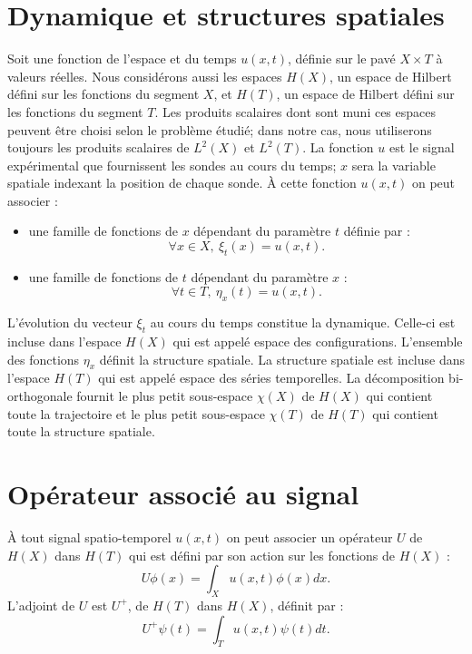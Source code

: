 \documentclass{book}
\begin{document}
\section{Dynamique et structures
spatiales}
Soit une fonction de l'espace et du temps $u(x,t)$,
d\'efinie sur le pav\'e $X \times T$ \`a valeurs r\'eelles. Nous
consid\'erons aussi les espaces
$H(X)$, un espace de Hilbert d\'efini sur les fonctions du segment $X$,
et $H(T)$, un espace de Hilbert d\'efini sur les fonctions du
segment $T$. Les produits scalaires dont sont muni ces espaces peuvent
\^etre 
choisi selon le probl\`eme \'etudi\'e; dans notre cas, nous utiliserons
toujours les produits scalaires de $L^2(X)$ et $L^2(T)$.
La fonction $u$ est  le signal exp\'erimental que fournissent les
sondes au cours du temps;  $x$ sera la variable spatiale indexant la
position de chaque sonde.
\`A cette fonction $u(x,t)$ on peut associer :

\begin{itemize}
\item une famille de fonctions de $x$ d\'ependant du param\`etre $t$
d\'efinie par : 
\begin{equation}
\forall x \in X,\ \xi_t(x)=u(x,t).
\end{equation}
\item une famille de fonctions de $t$ d\'ependant du param\`etre $x$ :
\begin{equation}
\forall t \in T,\ \eta_x(t)=u(x,t).
\end{equation}
\end{itemize}

L'\'evolution du vecteur  $\xi_t$ au cours du temps constitue
la dynamique. Celle-ci est incluse dans l'espace $H(X)$ qui est
appel\'e espace des configurations.
L'ensemble des fonctions $\eta_x$ d\'efinit la structure spatiale.
La structure spatiale
est incluse dans l'espace $H(T)$ qui est appel\'e espace des s\'eries
temporelles.
La d\'ecomposition bi-orthogonale fournit le plus petit sous-espace
$\chi(X)$ de $H(X)$ qui contient toute la trajectoire
et le plus petit sous-espace $\chi(T)$ de $H(T)$ qui
contient toute la structure spatiale.

\section{Op\'erateur associ\'e au signal}
\`A tout signal spatio-temporel $u(x,t)$ on peut associer
un op\'erateur $U$ de $H(X)$ dans $H(T)$ qui est d\'efini par son
action sur les 
fonctions de $H(X)$ :
\begin{equation}\label{equdefU}
U\phi(x)=\int_X u(x,t)\phi(x)dx.
\end{equation}
L'adjoint de $U$ est $U^+$, de $H(T)$ dans $H(X)$, d\'efinit par :
\begin{equation}\label{equdefUa}
U^+\psi(t)=\int_Tu(x,t)\psi(t)dt.
\end{equation}
\end{document}
